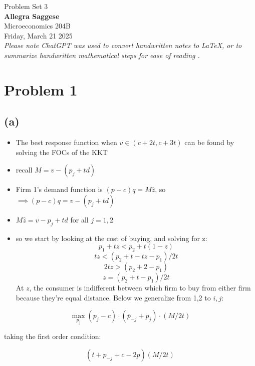 \documentclass{article}
\begin{document}
\begin{titlepage}
    \centering
    \vspace*{1in} 
    {\Large Problem Set 3} \\[1.5cm] %


    {\Large \textbf{Allegra Saggese}} \\[0.5cm] %
    {\large Microeconomics 204B} \\[1.5cm]

    {\large Friday, March 21 2025} \\ [.5cm] %
    {\small \textit{Please note ChatGPT was used to convert handwritten notes to LaTeX, or to summarize handwritten mathematical steps for ease of reading .}}
    \\[2cm] 

\end{titlepage}

\section{Problem 1}
\subsection*{(a)}

\begin{itemize}
    \item The best response function when $v \in (c+2t, c+3t)$ can be found by solving the FOCs of the KKT
    \item recall $M = v - (p_j + td)$
    \item Firm 1's demand function is $(p-c)q = M \hat{z}$, so $ \implies (p-c)q = v - (p_j + td)$
    \item $M \hat{z} = v - p_j + td$ for all $j = 1, 2$
    \item so we start by looking at the cost of buying, and solving for z: 
    \[
    p_1 + tz < p_2 + t(1-z) 
    \]
    \[
    tz < (p_2 + t - tz - p_1) / 2t
    \]
    \[
    2tz > (p_2 + 2 - p_1)
    \]
    \[
    z = (p_2 + t - p_1)/2t
    \]
    At $z$, the consumer is indifferent between which firm to buy from either firm because they're equal distance. Below we generalize from 1,2 to $i,j$:
\end{itemize}


\[
\max_{p_j} (p_j - c) \cdot (\overline{p}_{-j} +  p_j) \cdot (M/2t)
\]

taking the first order condition: 

\[
(t + p_{-j} + c - 2p)(M/2t)
\]
\end{document}
